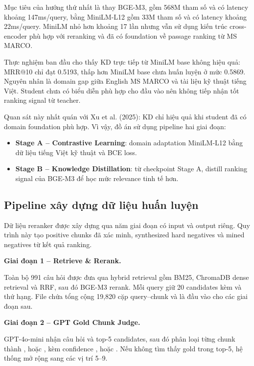 \documentclass[../DoAn.tex]{subfiles}
\begin{document}
Mục tiêu của hướng thứ nhất là thay BGE-M3, gồm 568M tham số và có latency khoảng 147ms/query, bằng MiniLM-L12 gồm 33M tham số và có latency khoảng 22ms/query. MiniLM nhỏ hơn khoảng 17 lần nhưng vẫn sử dụng kiến trúc cross-encoder phù hợp với reranking và đã có foundation về passage ranking từ MS MARCO.

Thực nghiệm ban đầu cho thấy KD trực tiếp từ MiniLM base không hiệu quả: MRR@10 chỉ đạt 0.5193, thấp hơn MiniLM base chưa huấn luyện ở mức 0.5869. Nguyên nhân là domain gap giữa English MS MARCO và tài liệu kỹ thuật tiếng Việt. Student chưa có biểu diễn phù hợp cho đầu vào nên không tiếp nhận tốt ranking signal từ teacher.

Quan sát này nhất quán với Xu et al. (2025): KD chỉ hiệu quả khi student đã có domain foundation phù hợp. Vì vậy, đồ án sử dụng pipeline hai giai đoạn:

\begin{itemize}
    \item \textbf{Stage A -- Contrastive Learning}: domain adaptation MiniLM-L12 bằng dữ liệu tiếng Việt kỹ thuật và BCE loss.
    \item \textbf{Stage B -- Knowledge Distillation}: từ checkpoint Stage A, distill ranking signal của BGE-M3 để học mức relevance tinh tế hơn.
\end{itemize}

\subsection{Pipeline xây dựng dữ liệu huấn luyện}
\label{subsection:4.2.2}

Dữ liệu reranker được xây dựng qua năm giai đoạn có input và output riêng. Quy trình này tạo positive chunks đã xác minh, synthesized hard negatives và mined negatives từ kết quả ranking.

\noindent\textbf{Giai đoạn 1 -- Retrieve \& Rerank.}

Toàn bộ 991 câu hỏi được đưa qua hybrid retrieval gồm BM25, ChromaDB dense retrieval và RRF, sau đó BGE-M3 rerank. Mỗi query giữ 20 candidates kèm  và thứ hạng. File  chứa tổng cộng 19,820 cặp query--chunk và là đầu vào cho các giai đoạn sau.

\noindent\textbf{Giai đoạn 2 -- GPT Gold Chunk Judge.}

GPT-4o-mini nhận câu hỏi và top-5 candidates, sau đó phân loại từng chunk thành ,  hoặc , kèm confidence ,  hoặc . Nếu không tìm thấy gold trong top-5, hệ thống mở rộng sang các vị trí 5--9.
\end{document}
